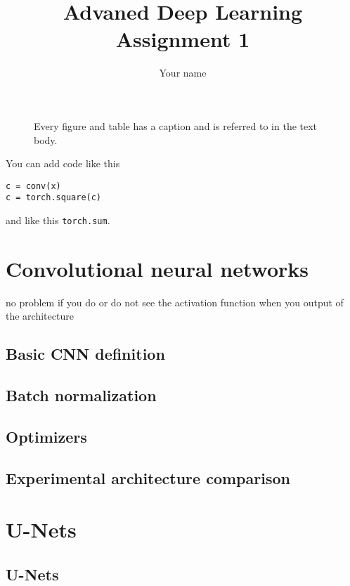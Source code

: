 \documentclass[12pt,a4paper]{article}
\begin{document}
\title{Advaned Deep Learning\\Assignment 1}
\author{\color{red}Your name}
\maketitle

\begin{figure}
  \begin{center}
  \end{center}
  \caption{Every figure and table has a caption and is referred to 
    in the text body.\label{fig:q6p1}}
\end{figure}



You can add code like this
\begin{lstlisting}
c = conv(x)
c = torch.square(c)
\end{lstlisting}
and like this \lstinline{torch.sum}.

\section{Convolutional neural networks}

no problem if you do or do not see the activation function when you output of the architecture 


\subsection{Basic CNN definition}
\subsection{Batch normalization}
\subsection{Optimizers}
\subsection{Experimental architecture comparison}
\section{U-Nets}
\subsection{U-Nets}
\end{document}
